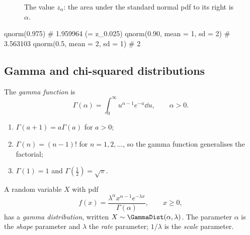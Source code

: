 \begin{figure}[ht]
\centering
{}
\caption{The value $z_\alpha$: the area under the standard normal pdf to its right is $\alpha$.}
\label{fig:z-alpha}
\end{figure}


\begin{rcode}
qnorm(0.975)                    # 1.959964  (= z_0.025)
qnorm(0.90, mean = 1, sd = 2)   # 3.563103
qnorm(0.5, mean = 2, sd = 1)    # 2
\end{rcode}

\subsection{Gamma and chi-squared distributions}\label{sec:gamma}

\begin{definition}\label{def:gamma-function}
The \emph{gamma function} is
\[
  \Gamma(\alpha) = \int_0^\infty u^{\alpha - 1} e^{-u} \dd u, \qquad \alpha > 0.
\]
\end{definition}

\begin{theorem}\label{thm:gamma-function-properties}
\leavevmode
\begin{enumerate}
  \item $\Gamma(a + 1) = a\Gamma(a)$ for $a > 0$;
  \item $\Gamma(n) = (n - 1)!$ for $n = 1, 2, \ldots$, so the gamma function generalises the factorial;
  \item $\Gamma(1) = 1$ and $\Gamma(\tfrac12) = \sqrt\pi$.
\end{enumerate}
\end{theorem}

\begin{definition}\label{def:gamma-distribution}
A random variable $X$ with pdf
\[
  f(x) = \frac{\lambda^\alpha x^{\alpha - 1} e^{-\lambda x}}{\Gamma(\alpha)}, \qquad x \ge 0,
\]
has a \emph{gamma distribution}, written $X \sim \GammaDist(\alpha, \lambda)$. The parameter $\alpha$ is the \emph{shape} parameter and $\lambda$ the \emph{rate} parameter; $1/\lambda$ is the \emph{scale} parameter.
\end{definition}

